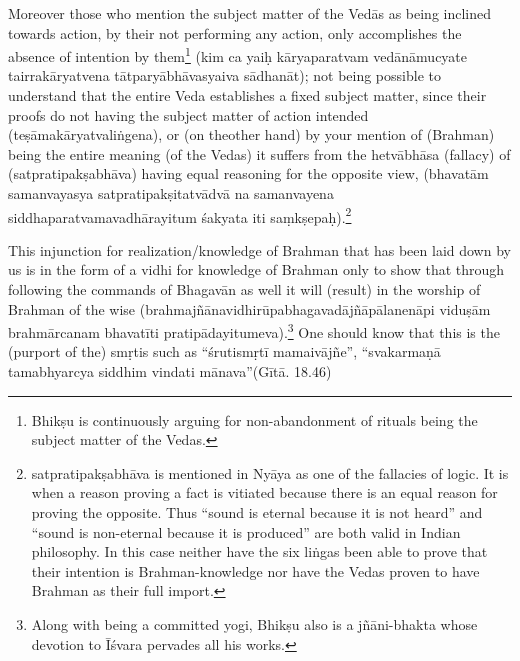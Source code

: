 \vskip 3pt

Moreover those who mention the subject matter of the Vedās as being inclined towards action,  by their not performing any action, only accomplishes the absence of intention by them\footnote{Bhikṣu is continuously arguing for non-abandonment of rituals being the subject matter of the Vedas.} (kim ca yaiḥ kāryaparatvam vedānāmucyate tairrakāryatvena tātparyābhāvasyaiva sādhanāt); not being possible to understand that the entire Veda establishes a fixed subject matter, since their proofs do not having the subject matter of action intended (teṣāmakāryatvaliṅgena),  or (on the\break other hand) by your mention of (Brahman) being the entire meaning (of the Vedas) it suffers from the hetvābhāsa (fallacy) of (satpratipakṣabhāva) having equal reasoning for the opposite view,  (bhavatām samanvayasya satpratipakṣitatvādvā na samanvayena siddhaparatvamavadhārayitum śakyata iti saṃkṣepaḥ).\footnote{satpratipakṣabhāva is mentioned in Nyāya as one of the fallacies of logic. It is when a reason proving a fact is vitiated because there is an equal reason for proving the opposite. Thus “sound is eternal because it is not heard” and “sound is non-eternal because it is produced” are both valid in Indian philosophy. In this case neither have the six liṅgas been able to prove that their intention is Brahman-knowledge nor have the Vedas proven to have Brahman as their full import.} 

\vskip 3pt

This injunction for realization/knowledge of Brahman that has been laid down by us is in the form of a vidhi for knowledge of Brahman  only to show that through following the commands of Bhagavān as well it will (result) in the worship of Brahman of the wise (brahmajñānavidhirūpabhagavadājñāpālanenāpi viduṣām brahmārcanam bhava\-tīti pratipādayitumeva).\footnote{Along with being a committed yogi, Bhikṣu also is a jñāni-bhakta whose devotion to Īśvara pervades all his works.} One should know that this is the (purport of the) smṛtis such as “śrutismṛtī mamaivājñe”, “svakarmaṇā tamabhyarcya siddhim vindati mānava”(Gītā. 18.46)

\vskip 6pt

